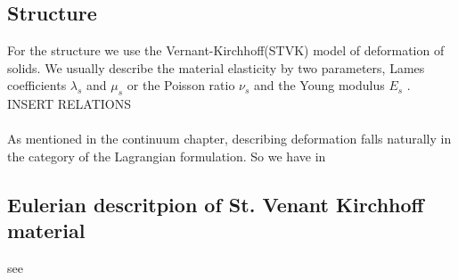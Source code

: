 \subsection*{Structure}
For the structure we use the Vernant-Kirchhoff(STVK) model of deformation of solids. We usually describe the material elasticity by two parameters, Lames coefficients $\lambda_s$ and $\mu_s$ or the Poisson ratio $\nu_s$
and the Young modulus $E_s$ \cite{dunne2006adaptive}. INSERT RELATIONS \\ \\

As mentioned in the continuum chapter, describing deformation falls naturally in the category of the Lagrangian formulation. So we have in 

\subsection*{Eulerian descritpion of St. Venant Kirchhoff material}
see \cite{richter2013fully}

